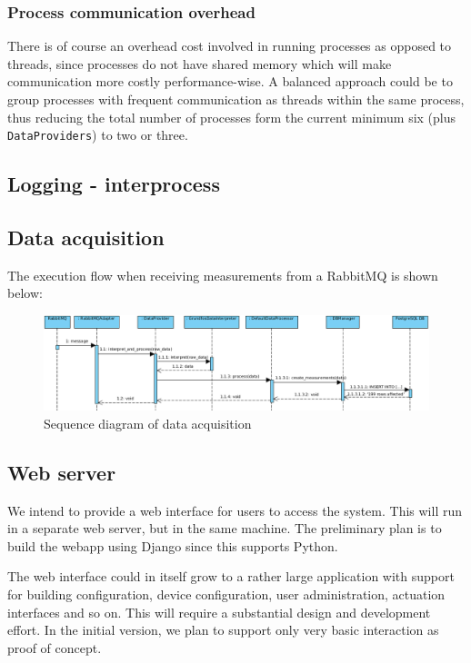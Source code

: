 \subsubsection{Process communication overhead}
There is of course an overhead cost involved in running processes as opposed to threads, since processes do not have shared memory which will make communication more costly performance-wise. A balanced approach could be to group processes with frequent communication as threads within the same process, thus reducing the total number of processes form the current minimum six (plus \texttt{DataProviders}) to two or three. 

\subsection{Logging - interprocess}

\newpage
\subsection{Data acquisition}
The execution flow when receiving measurements from a RabbitMQ is shown below:
\begin{figure}[H]
    \centering
    \includegraphics[width=\textwidth]{figures/data_acq_seq_diagram}
    \caption{Sequence diagram of data acquisition}
    \label{figureSeqDiagram}
\end{figure}


\subsection{Web server}\label{subsection:webserver}
We intend to provide a web interface for users to access the system. This will run in a separate web server, but in the same machine. The preliminary plan is to build the webapp using Django since this supports Python. 

The web interface could in itself grow to a rather large application with support for building configuration, device configuration, user administration, actuation interfaces and so on. This will require a substantial design and development effort. In the initial version, we plan to support only very basic interaction as proof of concept.